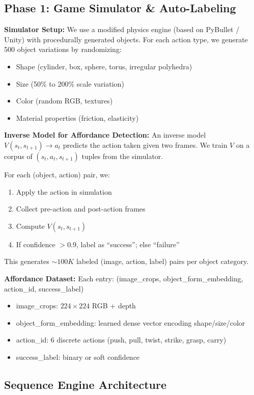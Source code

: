 \documentclass[11pt]{article}
\begin{document}
\subsection{Phase 1: Game Simulator \& Auto-Labeling}

\textbf{Simulator Setup:}
We use a modified physics engine (based on PyBullet / Unity) with procedurally generated objects. For each action type, we generate 500 object variations by randomizing:
\begin{itemize}
    \item Shape (cylinder, box, sphere, torus, irregular polyhedra)
    \item Size (50\% to 200\% scale variation)
    \item Color (random RGB, textures)
    \item Material properties (friction, elasticity)
\end{itemize}

\textbf{Inverse Model for Affordance Detection:}
An inverse model $V(s_t, s_{t+1}) \to a_t$ predicts the action taken given two frames. We train $V$ on a corpus of $(s_t, a_t, s_{t+1})$ tuples from the simulator.

For each (object, action) pair, we:
\begin{enumerate}
    \item Apply the action in simulation
    \item Collect pre-action and post-action frames
    \item Compute $V(s_t, s_{t+1})$
    \item If confidence $> 0.9$, label as ``success''; else ``failure''
\end{enumerate}

This generates $\sim 100K$ labeled (image, action, label) pairs per object category.

\textbf{Affordance Dataset:}
Each entry: (image\_crops, object\_form\_embedding, action\_id, success\_label)
\begin{itemize}
    \item image\_crops: $224 \times 224$ RGB + depth
    \item object\_form\_embedding: learned dense vector encoding shape/size/color
    \item action\_id: 6 discrete actions (push, pull, twist, strike, grasp, carry)
    \item success\_label: binary or soft confidence
\end{itemize}

\subsection{Sequence Engine Architecture}
\end{document}
